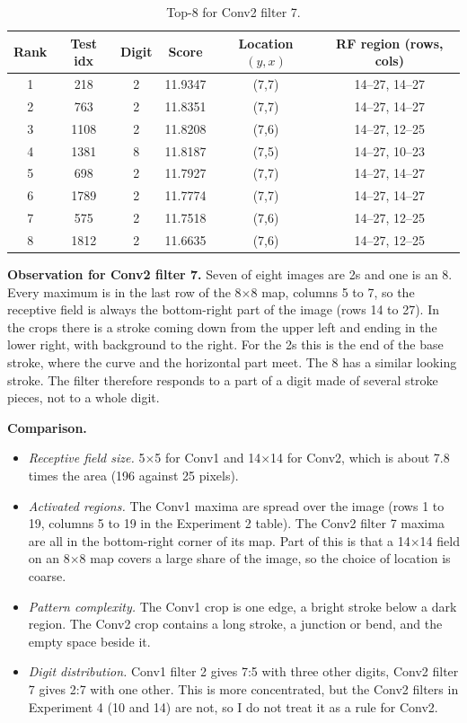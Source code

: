 \documentclass[12pt]{article}
\begin{document}
\begin{table}[H]
\centering
\small
\begin{tabular}{cccccc}
\toprule
Rank & Test idx & Digit & Score & Location $(y,x)$ & RF region (rows, cols) \\
\midrule
1 & 218  & 2 & 11.9347 & (7,7) & 14--27, 14--27 \\
2 & 763  & 2 & 11.8351 & (7,7) & 14--27, 14--27 \\
3 & 1108 & 2 & 11.8208 & (7,6) & 14--27, 12--25 \\
4 & 1381 & 8 & 11.8187 & (7,5) & 14--27, 10--23 \\
5 & 698  & 2 & 11.7927 & (7,7) & 14--27, 14--27 \\
6 & 1789 & 2 & 11.7774 & (7,7) & 14--27, 14--27 \\
7 & 575  & 2 & 11.7518 & (7,6) & 14--27, 12--25 \\
8 & 1812 & 2 & 11.6635 & (7,6) & 14--27, 12--25 \\
\bottomrule
\end{tabular}
\caption{Top-8 for Conv2 filter 7.}
\end{table}

\textbf{Observation for Conv2 filter 7.} Seven of eight images are 2s and one is an 8. Every maximum is in the last row of the 8$\times$8 map, columns 5 to 7, so the receptive field is always the bottom-right part of the image (rows 14 to 27). In the crops there is a stroke coming down from the upper left and ending in the lower right, with background to the right. For the 2s this is the end of the base stroke, where the curve and the horizontal part meet. The 8 has a similar looking stroke. The filter therefore responds to a part of a digit made of several stroke pieces, not to a whole digit.

\textbf{Comparison.}
\begin{itemize}
\item \emph{Receptive field size.} 5$\times$5 for Conv1 and 14$\times$14 for Conv2, which is about 7.8 times the area (196 against 25 pixels).
\item \emph{Activated regions.} The Conv1 maxima are spread over the image (rows 1 to 19, columns 5 to 19 in the Experiment 2 table). The Conv2 filter 7 maxima are all in the bottom-right corner of its map. Part of this is that a 14$\times$14 field on an 8$\times$8 map covers a large share of the image, so the choice of location is coarse.
\item \emph{Pattern complexity.} The Conv1 crop is one edge, a bright stroke below a dark region. The Conv2 crop contains a long stroke, a junction or bend, and the empty space beside it.
\item \emph{Digit distribution.} Conv1 filter 2 gives 7:5 with three other digits, Conv2 filter 7 gives 2:7 with one other. This is more concentrated, but the Conv2 filters in Experiment 4 (10 and 14) are not, so I do not treat it as a rule for Conv2.
\end{itemize}
\end{document}
